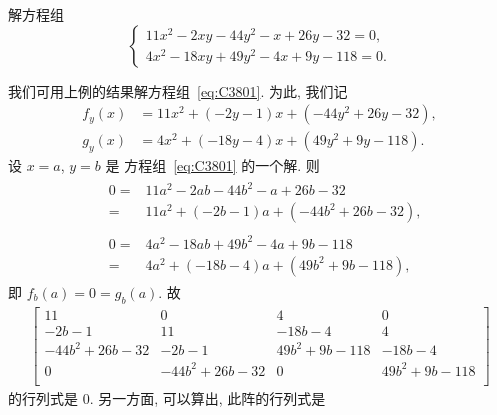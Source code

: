 \begin{example}
    解方程组
    \begin{equation}
        \begin{cases}
            11x^2 - 2xy - 44y^2 - x + 26y - 32 = 0, \\
            4x^2 - 18xy + 49y^2 - 4x + 9y - 118 = 0.
        \end{cases}
        \label{eq:C3801}
    \end{equation}

    我们可用上例的结果解方程组~\eqref{eq:C3801}.
    为此, 我们记
    \begin{align*}
        f_y (x) & = 11 x^2 + (-2 y - 1) x + (-44 y^2 + 26 y - 32), \\
        g_y (x) & = 4 x^2 + (-18 y - 4) x + (49 y^2 + 9 y - 118).
    \end{align*}
    设 \(x = a\), \(y = b\) 是%
    方程组~\eqref{eq:C3801} 的一个解.
    则
    \begin{align*}
         &
        \begin{aligned}
            0
            = {} &
            11a^2 - 2ab - 44b^2 - a + 26b - 32
            \\
            = {} &
            11 a^2 + (-2 b - 1) a + (-44 b^2 + 26 b - 32),
        \end{aligned}
        \\
         &
        \begin{aligned}
            0
            = {} &
            4a^2 - 18ab + 49b^2 - 4a + 9b - 118
            \\
            = {} &
            4 a^2 + (-18 b - 4) a + (49 b^2 + 9 b - 118),
        \end{aligned}
    \end{align*}
    即 \(f_b (a) = 0 = g_b (a)\).
    故
    \begin{align*}
        \begin{bmatrix}
            11            & 0             & 4            & 0            \\
            -2b-1         & 11            & -18b-4       & 4            \\
            -44b^2+26b-32 & -2b-1         & 49b^2+9b-118 & -18b-4       \\
            0             & -44b^2+26b-32 & 0            & 49b^2+9b-118 \\
        \end{bmatrix}
    \end{align*}
    的行列式是 \(0\).
    另一方面, 可以算出, 此阵的行列式是

\end{example}
